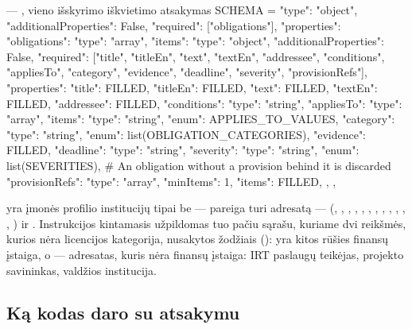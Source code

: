 \begin{codefile}{ --- , vieno išskyrimo iškvietimo atsakymas}
SCHEMA = {
    "type": "object", "additionalProperties": False, "required": ["obligations"],
    "properties": {"obligations": {"type": "array", "items": {
        "type": "object", "additionalProperties": False,
        "required": ["title", "titleEn", "text", "textEn", "addressee", "conditions", "appliesTo", "category",
                     "evidence", "deadline", "severity", "provisionRefs"],
        "properties": {
            "title": FILLED,
            "titleEn": FILLED,
            "text": FILLED,
            "textEn": FILLED,
            "addressee": FILLED,
            "conditions": {"type": "string"},
            "appliesTo": {"type": "array", "items": {"type": "string", "enum": APPLIES_TO_VALUES}},
            "category": {"type": "string", "enum": list(OBLIGATION_CATEGORIES)},
            "evidence": FILLED,
            "deadline": {"type": "string"},
            "severity": {"type": "string", "enum": list(SEVERITIES)},
            # An obligation without a provision behind it is discarded
            "provisionRefs": {"type": "array", "minItems": 1, "items": FILLED},
        },
    }}},
}
\end{codefile}

 yra įmonės profilio institucijų tipai be  --- pareiga
turi adresatą --- (, , , ,
, , , ,
, , , ,
) ir . Instrukcijos kintamasis  užpildomas tuo
pačiu sąrašu, kuriame dvi reikšmės, kurios nėra licencijos kategorija, nusakytos žodžiais
():  yra kitos rūšies finansų įstaiga, o
 --- adresatas, kuris nėra finansų įstaiga: IRT paslaugų teikėjas, projekto
savininkas, valdžios institucija.

\subsection{Ką kodas daro su atsakymu}\label{sec:obligations:answer}

